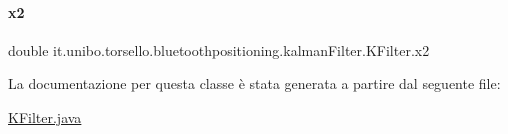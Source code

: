 \paragraph{\texorpdfstring{x2}{x2}}
{\footnotesize\ttfamily double it.\+unibo.\+torsello.\+bluetoothpositioning.\+kalman\+Filter.\+K\+Filter.\+x2\hspace{0.3cm}{\ttfamily [private]}}



La documentazione per questa classe è stata generata a partire dal seguente file\+:\begin{DoxyCompactItemize}
\item 
\hyperlink{KFilter_8java}{K\+Filter.\+java}\end{DoxyCompactItemize}
